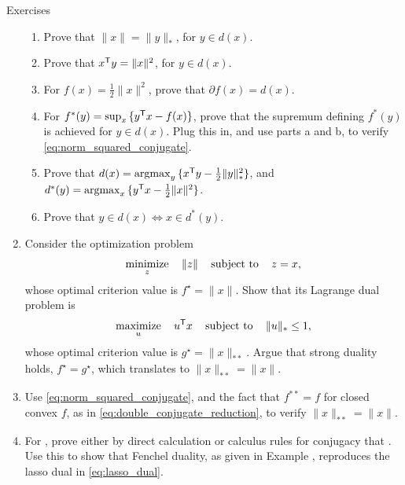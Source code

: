 \begin{xcb}{Exercises}
\begin{enumerate}[label=\thechapter.\arabic*]
\begin{enumerate}[label=\alph*.] 
\item Prove that $\|x\| = \|y\|_*$, for $y \in d(x)$.
\item Prove that $x^{\mathsf{T}} y = \|x\|^2$, for $y \in d(x)$. 
\item For $f(x) = \frac{1}{2} \|x\|^2$, prove that $\partial f(x) = d(x)$. 
\item For $f^*(y) = \sup_x \, \{ y^{\mathsf{T}} x - f(x) \}$, prove that the supremum
  defining $f^*(y)$ is achieved for $y \in d(x)$. Plug this in, and use parts a
  and b, to verify \eqref{eq:norm_squared_conjugate}. 
\item Prove that $d(x) = \operatorname*{argmax}_y \, \{ x^{\mathsf{T}} y - \frac{1}{2} \|y\|_*^2 \}$, and 
  $d^*(y) = \operatorname*{argmax}_x \, \{ y^{\mathsf{T}} x - \frac{1}{2} \|x\|^2 \}$. 
\item Prove that $y \in d(x) \iff x \in d^*(y)$.
\end{enumerate}

\item \label{ex:dual_norm_dual2}
  Consider the optimization problem 
  \[
  \operatorname*{minimize}_z \quad \|z\| \quad \operatorname{subject\,\,to} \quad z = x,
  \]
  whose optimal criterion value is $f^\star = \|x\|$. Show that its Lagrange 
  dual problem is 
  \[
  \operatorname*{maximize}_u \quad u^{\mathsf{T}} x \quad \operatorname{subject\,\,to} \quad \|u\|_* \leq 1,
  \]
  whose optimal criterion value is $g^\star = \|x\|_{**}$. Argue that strong 
  duality holds, $f^\star = g^\star$, which translates to $\|x\|_{**} = \|x\|$. 

\item \label{ex:dual_norm_dual3}
  Use \eqref{eq:norm_squared_conjugate}, and the fact that $f^{**} = f$ for
  closed convex $f$, as in \eqref{eq:double_conjugate_reduction}, to verify
  $\|x\|_{**} = \|x\|$.  

\item \label{ex:lasso_fenchel_dual}
  For , prove either by direct
  calculation or calculus rules for conjugacy that . Use this to show that Fenchel
  duality, as given in Example , reproduces the lasso 
  dual in \eqref{eq:lasso_dual}.


\end{enumerate}
\end{xcb}
